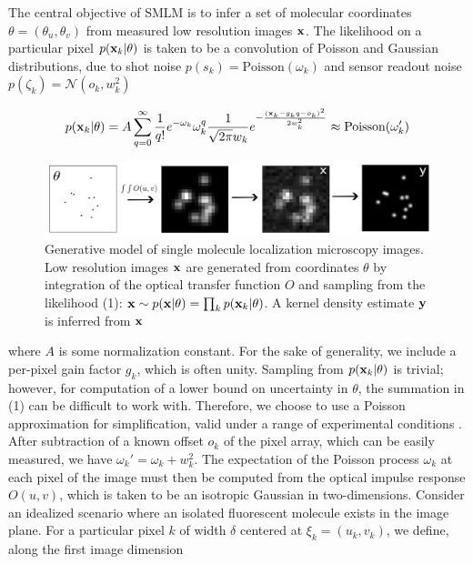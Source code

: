\documentclass{article}
\begin{document}
The central objective of SMLM is to infer a set of molecular coordinates $\theta=(\theta_{u},\theta_{v})$ from measured low resolution images $\bold{x}$. The likelihood on a particular pixel $p(\bold{x}_k|\theta)$ is taken to be a convolution of Poisson and Gaussian distributions, due to shot noise $p(s_{k}) = \mathrm{Poisson}(\omega_{k})$ and sensor readout noise $p(\zeta_{k}) = \mathcal{N}(o_{k},w_{k}^{2})$ 

\begin{equation}
p(\bold{x}_{k}|\theta) = A\sum_{q=0}^{\infty} \frac{1}{q!}e^{-\omega_{k}}\omega_{k}^{q}\frac{1}{\sqrt{2\pi}w_{k}}e^{-\frac{(\bold{x}_{k}-g_{k}q-o_{k})^2}{2 w_{k}^{2}}} \approx \mathrm{Poisson}(\omega_{k}')
\end{equation}


\begin{figure}
\includegraphics[scale=0.225]{media/Generation.png}
\caption{Generative model of single molecule localization microscopy images. Low resolution images $\bold{x}$ are generated from coordinates $\theta$ by integration of the optical transfer function $O$ and sampling from the likelihood (1): $\bold{x}\sim p(\bold{x}|\theta) = \prod_{k} p(\bold{x}_k|\theta)$. A kernel density estimate $\bold{y}$ is inferred from $\bold{x}$}
\end{figure}

where $A$ is some normalization constant. For the sake of generality, we include a per-pixel gain factor $g_{k}$, which is often unity. Sampling from $p(\bold{x}_{k}|\theta)$ is trivial; however, for computation of a lower bound on uncertainty in $\theta$, the summation in (1) can be difficult to work with. Therefore, we choose to use a Poisson approximation for simplification, valid under a range of experimental conditions \citep{Huang2013}. After subtraction of a known offset $o_{k}$ of the pixel array, which can be easily measured, we have $\omega_{k}' = \omega_{k} + w_{k}^{2}$. The expectation of the Poisson process $\omega_{k}$ at each pixel of the image must then be computed from the optical impulse response $O(u,v)$, which is taken to be an isotropic Gaussian in two-dimensions. Consider an idealized scenario where an isolated fluorescent molecule exists in the image plane. For a particular pixel $k$ of width $\delta$ centered at $\xi_{k}=(u_k,v_k)$, we define, along the first image dimension
\end{document}
